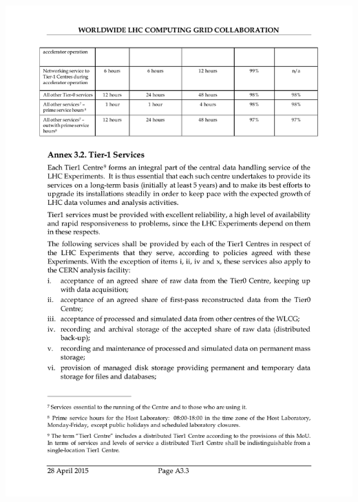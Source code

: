 \documentclass{beamer}
\begin{document}
\begin{frame}
  \includegraphics[scale=0.51, trim={1cm 10cm 1cm 2cm},clip]{mou_page24.pdf}
\end{frame}
\end{document}
